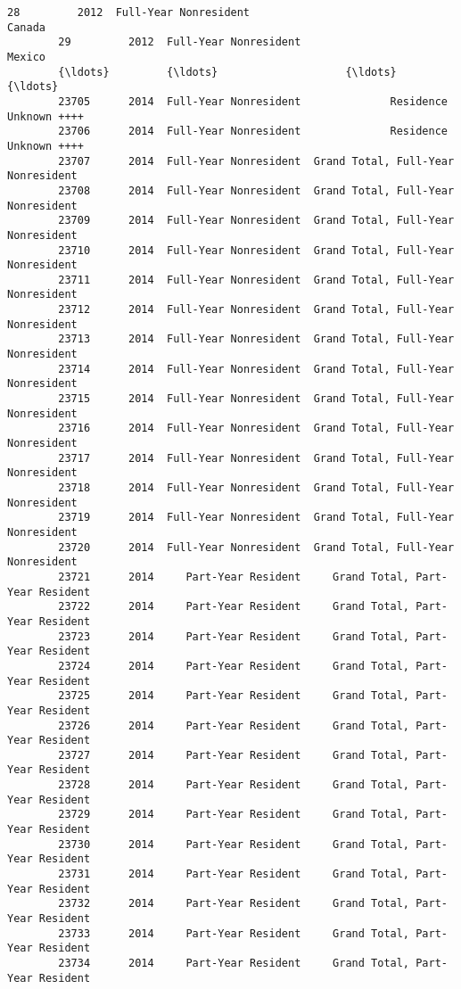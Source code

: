 \documentclass[11pt]{article}
\begin{document}
\begin{Verbatim}[commandchars=\\\{\}]
        28         2012  Full-Year Nonresident                              Canada   
        29         2012  Full-Year Nonresident                              Mexico   
        {\ldots}         {\ldots}                    {\ldots}                                 {\ldots}   
        23705      2014  Full-Year Nonresident              Residence Unknown ++++   
        23706      2014  Full-Year Nonresident              Residence Unknown ++++   
        23707      2014  Full-Year Nonresident  Grand Total, Full-Year Nonresident   
        23708      2014  Full-Year Nonresident  Grand Total, Full-Year Nonresident   
        23709      2014  Full-Year Nonresident  Grand Total, Full-Year Nonresident   
        23710      2014  Full-Year Nonresident  Grand Total, Full-Year Nonresident   
        23711      2014  Full-Year Nonresident  Grand Total, Full-Year Nonresident   
        23712      2014  Full-Year Nonresident  Grand Total, Full-Year Nonresident   
        23713      2014  Full-Year Nonresident  Grand Total, Full-Year Nonresident   
        23714      2014  Full-Year Nonresident  Grand Total, Full-Year Nonresident   
        23715      2014  Full-Year Nonresident  Grand Total, Full-Year Nonresident   
        23716      2014  Full-Year Nonresident  Grand Total, Full-Year Nonresident   
        23717      2014  Full-Year Nonresident  Grand Total, Full-Year Nonresident   
        23718      2014  Full-Year Nonresident  Grand Total, Full-Year Nonresident   
        23719      2014  Full-Year Nonresident  Grand Total, Full-Year Nonresident   
        23720      2014  Full-Year Nonresident  Grand Total, Full-Year Nonresident   
        23721      2014     Part-Year Resident     Grand Total, Part-Year Resident   
        23722      2014     Part-Year Resident     Grand Total, Part-Year Resident   
        23723      2014     Part-Year Resident     Grand Total, Part-Year Resident   
        23724      2014     Part-Year Resident     Grand Total, Part-Year Resident   
        23725      2014     Part-Year Resident     Grand Total, Part-Year Resident   
        23726      2014     Part-Year Resident     Grand Total, Part-Year Resident   
        23727      2014     Part-Year Resident     Grand Total, Part-Year Resident   
        23728      2014     Part-Year Resident     Grand Total, Part-Year Resident   
        23729      2014     Part-Year Resident     Grand Total, Part-Year Resident   
        23730      2014     Part-Year Resident     Grand Total, Part-Year Resident   
        23731      2014     Part-Year Resident     Grand Total, Part-Year Resident   
        23732      2014     Part-Year Resident     Grand Total, Part-Year Resident   
        23733      2014     Part-Year Resident     Grand Total, Part-Year Resident   
        23734      2014     Part-Year Resident     Grand Total, Part-Year Resident   
        

\end{Verbatim}
\end{document}
